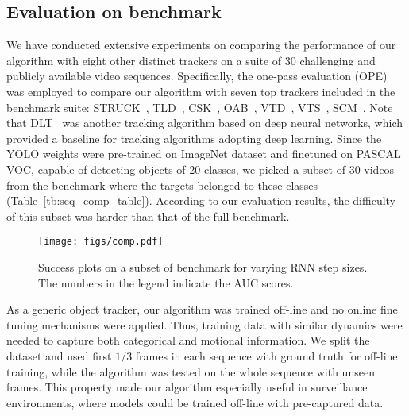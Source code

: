 \documentclass[10pt,twocolumn,letterpaper]{article}
\begin{document}
\subsection{Evaluation on benchmark}

We have conducted extensive experiments on comparing the performance of our algorithm with eight other distinct trackers on a suite of 30 challenging and publicly available video sequences. Specifically, the one-pass evaluation (OPE)~\cite{wu2013online} was employed to compare our algorithm with seven top trackers included in the benchmark suite: STRUCK~\cite{hare2011struck}, TLD~\cite{kalal2012tracking}, CSK~\cite{henriques2012exploiting}, OAB~\cite{grabner2006real}, VTD~\cite{kwon2010visual}, VTS~\cite{kwon2011tracking}, SCM~\cite{zhong2012robust}. Note that DLT~\cite{wang2013learning} was another tracking algorithm based on deep neural networks, which provided a baseline for tracking algorithms adopting deep learning. Since the YOLO weights were pre-trained on ImageNet dataset and finetuned on PASCAL VOC, capable of detecting objects of 20 classes, we picked a subset of 30 videos from the benchmark where the targets belonged to these classes (Table~\ref{tb:seq_comp_table}). According to our evaluation results, the difficulty of this subset was harder than that of the full benchmark.

\begin{figure}[t]
\begin{center}
   \texttt{[image: figs/comp.pdf]}
\end{center}
   \caption{Success plots on a subset of benchmark for varying RNN step sizes. The numbers in the legend indicate the AUC scores.}
\label{fig:internal}
\vspace{-3ex}
\end{figure}

As a generic object tracker, our algorithm was trained off-line and no online fine tuning mechanisms were applied. Thus, training data with similar dynamics were needed to capture both categorical and motional information. We split the dataset and used first $1/3$ frames in each sequence with ground truth for off-line training, while the algorithm was tested on the whole sequence with unseen frames. This property made our algorithm especially useful in surveillance environments, where models could be trained off-line with pre-captured data.
\end{document}
